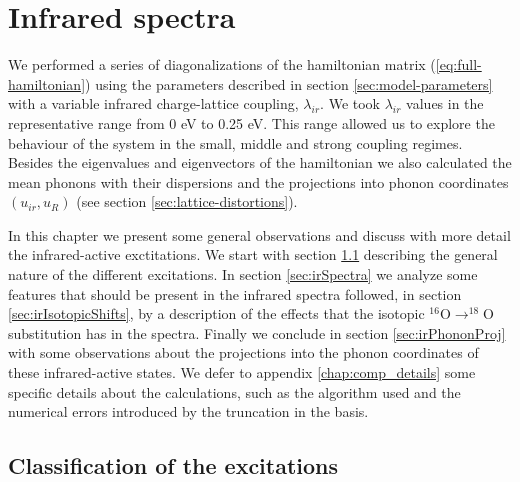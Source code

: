 \chapter{Infrared spectra}
\label{chap:irSpectra}

We performed a series of diagonalizations of the hamiltonian matrix (\ref{eq:full-hamiltonian}) using the parameters described in section \ref{sec:model-parameters} with a variable infrared charge-lattice coupling, $\lambda_{ir}$. 
We took $\lambda_{ir}$ values in the representative range from 0 eV to 0.25 eV. 
This range allowed us to explore the behaviour of the system in the small, middle and strong coupling regimes. 
Besides the eigenvalues and eigenvectors of the hamiltonian we also calculated the mean phonons with their dispersions and the projections into phonon coordinates $(u_{ir}, u_R)$ (see section \ref{sec:lattice-distortions}).

In this chapter we present some general observations and discuss with more detail the infrared-active exctitations.
We start with section \ref{sec:classification} describing the general nature of the different excitations. 
In section \ref{sec:irSpectra} we analyze some features that should be present in the infrared spectra followed, in section \ref{sec:irIsotopicShifts}, by a description of the effects that the isotopic $^{16}$O$\rightarrow ^{18}$O substitution has in the spectra. 
Finally we conclude in section \ref{sec:irPhononProj} with some observations about the projections into the phonon coordinates of these infrared-active states.
We defer to appendix \ref{chap:comp_details} some specific details about the calculations, such as the algorithm used and the numerical errors introduced by the truncation in the basis.

\section{Classification of the excitations}
\label{sec:classification}

